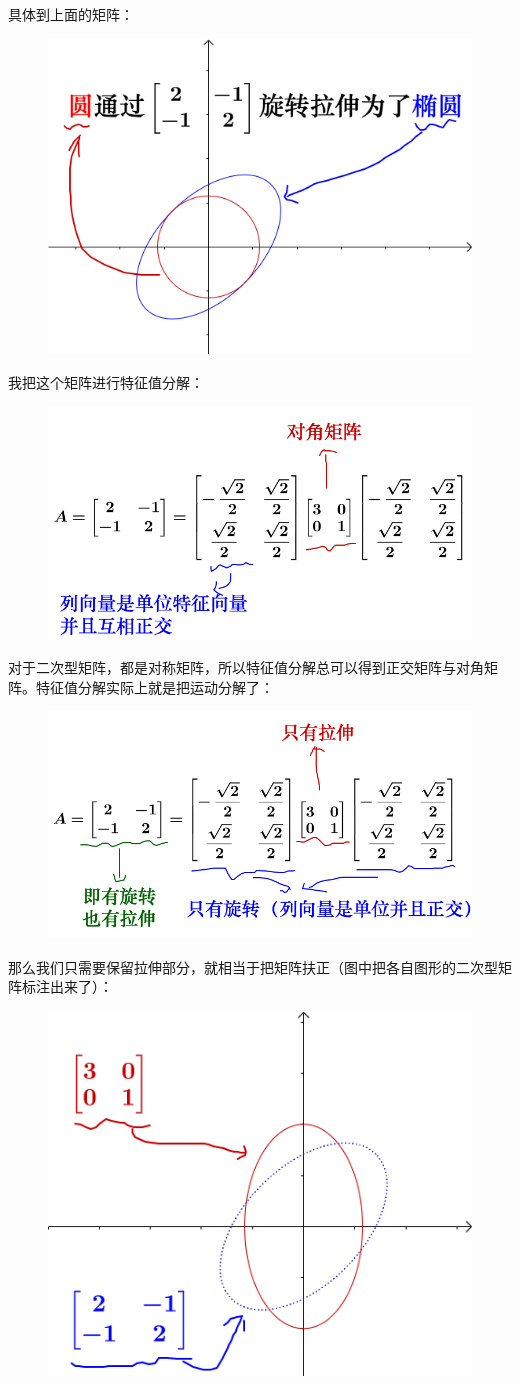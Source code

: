 \documentclass[12pt]{article}
\begin{document}
具体到上面的矩阵：
\begin{figure}[H]
    \centering
    \includegraphics[width=.3\textwidth]{fig/UnderstandQuadraticForm_7.png}
\end{figure} 

我把这个矩阵进行特征值分解：
\begin{figure}[H]
    \centering
    \includegraphics[width=.5\textwidth]{fig/UnderstandQuadraticForm_8.png}
\end{figure} 

对于二次型矩阵，都是对称矩阵，所以特征值分解总可以得到正交矩阵与对角矩阵。特征值分解实际上就是把运动分解了：
\begin{figure}[H]
    \centering
    \includegraphics[width=.5\textwidth]{fig/UnderstandQuadraticForm_9.png}
\end{figure} 

那么我们只需要保留拉伸部分，就相当于把矩阵扶正（图中把各自图形的二次型矩阵标注出来了）：
\begin{figure}[H]
    \centering
    \includegraphics[width=.3\textwidth]{fig/UnderstandQuadraticForm_10.png}
\end{figure} 
\end{document}
